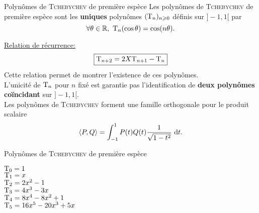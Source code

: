 \begin{box_titre}{Polynômes de \textsc{Tchebychev} de première espèce}
    Les polynômes de \textsc{Tchebychev} de première espèce sont les \textbf{uniques} polynômes $(\mathrm{T}_n)_{n \geqslant 0}$ définis sur $]-1, 1[$ par
    $$\forall \theta \in \mathbb{R},\ \mathrm{T}_n (\cos \theta) = \cos(n \theta).$$
\end{box_titre}

\underline{Relation de récurrence:}
$$\boxed{\mathrm{T}_{n+2} = 2X \mathrm{T}_{n+1} - \mathrm{T}_n}$$
Cette relation permet de montrer l'existence de ces polynômes. \\
L'unicité de $\mathrm{T}_n$ pour $n$ fixé est garantie pas l'identification de \textbf{deux polynômes coïncidant} sur $]-1, 1[$. \\
Les polynômes de \textsc{Tchebychev} forment une famille orthogonale pour le produit scalaire
$$\langle P, Q \rangle = \int_{-1}^{1} P(t) Q(t) \frac{1}{\sqrt{1-t^2}}\ \mathrm{d} t.$$

\begin{marginfigure}[-8.5cm]
	
	\caption{Polynômes de \textsc{Tchebychev} de première espèce}
	\begin{flushright}
	{\scriptsize
	\color{blue} $\mathrm{T}_0 = 1$ \\ 
	\color{red} $\mathrm{T}_1 = x$ \\
	\color{green} $\mathrm{T}_2 = 2x^2-1$ \\
	\color{purple} $\mathrm{T}_3 = 4x^3-3x$ \\
	\color{black} $\mathrm{T}_4 = 8x^4-8x^2+1$ \\
	\color{orange} $\mathrm{T}_5 = 16x^5-20x^3+5x$
	}
	\end{flushright}
\end{marginfigure}
